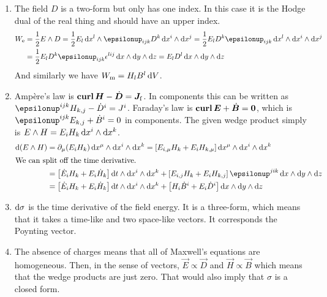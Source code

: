 \documentclass[11pt, english, fleqn, DIV=15, headinclude, BCOR=1cm]{scrartcl}
\begin{document}
\begin{enumerate}
    \item
The field $D$ is a two-form but only has one index. In this case it is the
Hodge dual of the real thing and should have an upper index.
\begin{align*}
    W_\mathrm e
    &= \frac12 E \wedge D
    = \frac 12 E_l \dif x^l \wedge \epsilonup_{ijk} D^k \dif x^i \wedge \dif
    x^j
    = \frac 12 E_l D^k \epsilonup_{ijk} \dif x^l \wedge \dif x^i \wedge \dif
    x^j \\
    &= \frac 12 E_l D^k \epsilonup_{ijk} \epsilon^{lij} \dif x \wedge \dif y \wedge \dif
    z
    = E_l D^l \dif x \wedge \dif y \wedge \dif z
\end{align*}
And similarly we have $W_\mathrm m = H_l B^l \mathop{}\!\mathrm d V$.

\item

Ampère's law is $\curl \vec H - \dot {\vec D} = \vec J_\mathrm f$. In
components this can be written as $\epsilonup^{ijk} H_{k,j} - \dot D^i = J^i$.
Faraday's law is $\curl \vec E + \dot{\vec B} = \vec 0$, which is
$\epsilonup^{ijk} E_{k,j} + \dot B^i = 0$ in components. The given wedge
product simply is $E \wedge H = E_i H_k \mathop{}\!\mathrm d x^i \wedge \mathop{}\!\mathrm d x^k$.
\begin{align*}
    \dif(E \wedge H)
    &= \partial_\mu (E_i H_k) \dif x^\mu \wedge \dif x^i \wedge \dif x^k
    = \sbr{E_{i,\mu} H_k + E_i H_{k,\mu}} \dif x^\mu \wedge \dif x^i \wedge
    \dif x^k \\
    \intertext{%
        We can split off the time derivative.
    }
    &= \sbr{\dot E_i H_k + E_i \dot H_k} \dif t \wedge \dif x^i \wedge \dif x^k
    + \sbr{E_{i,j} H_k + E_i H_{k,j}} \epsilonup^{jik} \dif x \wedge \dif y
    \wedge \dif z \\
    &= \sbr{\dot E_i H_k + E_i \dot H_k} \dif t \wedge \dif x^i \wedge \dif x^k
    + \sbr{H_i \dot B^i + E_i \dot D^i} \dif x \wedge \dif y \wedge \dif z
\end{align*}

\item
    $\mathop{}\!\mathrm d \sigma$ is the time derivative of the field energy. It is a
    three-form, which means that it takes a time-like and two space-like
    vectors. It corresponds the Poynting vector.

\item
    The absence of charges means that all of Maxwell's equations are
    homogeneous. Then, in the sense of vectors, $\vec E \propto \vec D$ and
    $\vec H \propto \vec B$ which means that the wedge products are just zero.
    That would also imply that $\sigma$ is a closed form.

\end{enumerate}
\end{document}
